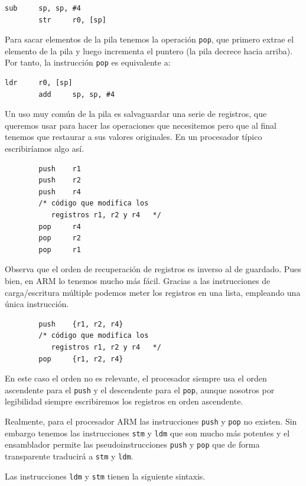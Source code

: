 \begin{lstlisting}[caption={Operación push}]
        sub     sp, sp, #4
        str     r0, [sp]
\end{lstlisting}

Para sacar elementos de la pila tenemos la operación {\tt pop}, que primero extrae
el elemento de la pila y luego incrementa el puntero (la pila decrece hacia arriba).
Por tanto, la instrucción {\tt pop} es equivalente a:

\begin{lstlisting}[caption={Operación pop}]
        ldr     r0, [sp]
        add     sp, sp, #4
\end{lstlisting}

Un uso muy común de la pila es salvaguardar una serie de registros, que queremos
usar para hacer las operaciones que necesitemos pero que al final tenemos que
restaurar a sus valores originales. En un procesador típico escribiríamos algo así.

\begin{lstlisting}
        push    r1
        push    r2
        push    r4
        /* código que modifica los
           registros r1, r2 y r4   */
        pop     r4
        pop     r2
        pop     r1
\end{lstlisting}

Observa que el orden de recuperación de registros es inverso al de guardado. Pues
bien, en ARM lo tenemos mucho más fácil. Gracias a las instrucciones de carga/escritura
múltiple podemos meter los registros en una lista, empleando una única instrucción.

\begin{lstlisting}
        push    {r1, r2, r4}
        /* código que modifica los
           registros r1, r2 y r4   */
        pop     {r1, r2, r4}
\end{lstlisting}

En este caso el orden no es relevante, el procesador siempre usa el orden ascendente para
el {\tt push} y el descendente para el {\tt pop}, aunque nosotros por legibilidad siempre
escribiremos los registros en orden ascendente.

Realmente, para el procesador ARM las instrucciones {\tt push} y {\tt pop} no existen.
Sin embargo tenemos las
instrucciones {\tt stm} y {\tt ldm} que son mucho más potentes y el ensamblador
permite las pseudoinstrucciones {\tt push} y {\tt pop} que de forma transparente
traducirá a {\tt stm} y {\tt ldm}.

Las instrucciones {\tt ldm} y {\tt stm} tienen la siguiente sintaxis.

